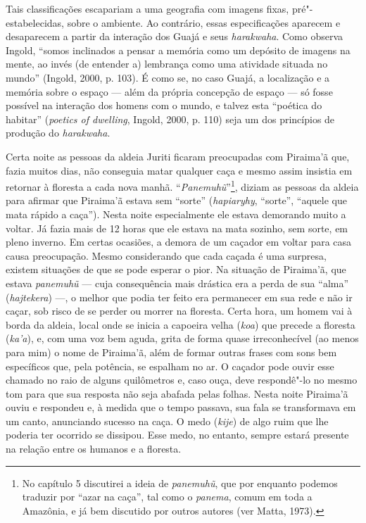 Tais classificações escapariam a uma geografia com imagens fixas,
pré"-estabelecidas, sobre o ambiente. Ao contrário, essas especificações
aparecem e desaparecem a partir da interação dos Guajá e seus
\emph{harakwaha}. Como observa Ingold, ``somos inclinados a pensar a
memória como um depósito de imagens na mente, ao invés (de entender a)
lembrança como uma atividade situada no mundo'' (Ingold, 2000, p. 103). É
como se, no caso Guajá, a localização e a memória sobre o espaço --- além
da própria concepção de espaço --- só fosse possível na interação dos
homens com o mundo, e talvez esta ``poética do habitar'' (\emph{poetics of
dwelling}, Ingold, 2000, p. 110) seja um dos princípios de produção do
\emph{harakwaha}.

Certa noite as pessoas da aldeia Juriti ficaram preocupadas com
Piraima'ã que, fazia muitos dias, não conseguia matar qualquer caça e
mesmo assim insistia em retornar à floresta a cada nova manhã.
``\emph{Panemuhũ}''\footnote{No capítulo 5 discutirei a ideia de
  \emph{panemuhũ}, que por enquanto podemos traduzir por ``azar na
  caça'', tal como o \emph{panema}, comum em toda a Amazônia, e já bem
  discutido por outros autores (ver Matta, 1973).}, diziam as pessoas da
aldeia para afirmar que Piraima'ã estava sem ``sorte'' (\emph{hapiaryhy},
``sorte'', ``aquele que mata rápido a caça''). Nesta noite especialmente ele
estava demorando muito a voltar. Já fazia mais de 12 horas que ele
estava na mata sozinho, sem sorte, em pleno inverno. Em certas ocasiões,
a demora de um caçador em voltar para casa causa preocupação. Mesmo
considerando que cada caçada é uma surpresa, existem situações de que se
pode esperar o pior. Na situação de Piraima'ã, que estava
\emph{panemuhũ} --- cuja consequência mais drástica era a perda de sua
``alma'' (\emph{hajtekera}) ---, o melhor que podia ter feito era permanecer
em sua rede e não ir caçar, sob risco de se perder ou morrer na
floresta. Certa hora, um homem vai à borda da aldeia, local onde se
inicia a capoeira velha (\emph{koa}) que precede a floresta
(\emph{ka'a}), e, com uma voz bem aguda, grita de forma quase
irreconhecível (ao menos para mim) o nome de Piraima'ã, além de formar
outras frases com sons bem específicos que, pela potência, se espalham
no ar. O caçador pode ouvir esse chamado no raio de alguns quilômetros
e, caso ouça, deve respondê"-lo no mesmo tom para que sua resposta não
seja abafada pelas folhas. Nesta noite Piraima'ã ouviu e respondeu e, à
medida que o tempo passava, sua fala se transformava em um canto,
anunciando sucesso na caça. O medo (\emph{kije}) de algo ruim que lhe
poderia ter ocorrido se dissipou. Esse medo, no entanto, sempre estará
presente na relação entre os humanos e a floresta.

